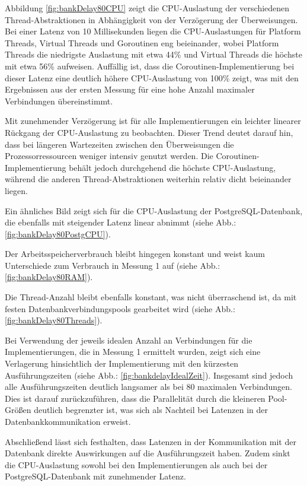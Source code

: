 \documentclass[fontsize=12pt,paper=a4,twoside=semi,parskip=half-,headsepline,headinclude]{scrreprt}
\begin{document}
Abbildung \ref{fig:bankDelay80CPU} zeigt die CPU-Auslastung der verschiedenen Thread-Abstraktionen in Ab\-hän\-gig\-keit von der Verzögerung der Überweisungen. Bei einer Latenz von 10 Millisekunden liegen die CPU-Auslastungen für Platform Threads, Virtual Threads und Goroutinen eng beieinander, wobei Platform Threads die niedrigste Auslastung mit etwa 44\% und Virtual Threads die höchste mit etwa 56\% aufweisen. Auffällig ist, dass die Coroutinen-Implementierung bei dieser Latenz eine deutlich höhere CPU-Auslastung von 100\% zeigt, was mit den Ergebnissen aus der ersten Messung für eine hohe Anzahl maximaler Verbindungen übereinstimmt.

Mit zunehmender Verzögerung ist für alle Implementierungen ein leichter linearer Rück\-gang der CPU-Auslastung zu beobachten. Dieser Trend deutet darauf hin, dass bei längeren Wartezeiten zwischen den Überweisungen die Prozessorressourcen weniger intensiv genutzt werden. Die Coroutinen-Implementierung behält jedoch durchgehend die höchste CPU-Auslastung, während die anderen Thread-Abstraktionen weiterhin relativ dicht beieinander liegen.

Ein ähnliches Bild zeigt sich für die CPU-Auslastung der PostgreSQL-Datenbank, die ebenfalls mit steigender Latenz linear abnimmt (siehe Abb.: \ref{fig:bankDelay80PostgCPU}). 

Der Arbeitsspeicherverbrauch bleibt hingegen konstant und weist kaum Unterschiede zum Verbrauch in Messung 1 auf (siehe Abb.: \ref{fig:bankDelay80RAM}).

Die Thread-Anzahl bleibt ebenfalls konstant, was nicht überraschend ist, da mit festen Datenbankverbindungspools gearbeitet wird (siehe Abb.: \ref{fig:bankDelay80Threads}).

Bei Verwendung der jeweils idealen Anzahl an Verbindungen für die Implementierungen, die in Messung 1 ermittelt wurden, zeigt sich eine Verlagerung hinsichtlich der Implementierung mit den kürzesten Ausführungszeiten (siehe Abb.: \ref{fig:bankdelayIdealZeit}). Insgesamt sind jedoch alle Ausführungszeiten deutlich langsamer als bei 80 maximalen Verbindungen. Dies ist darauf zurückzuführen, dass die Parallelität durch die kleineren Pool-Größen deutlich begrenzter ist, was sich als Nachteil bei Latenzen in der Datenbankkommunikation erweist.

Abschließend lässt sich festhalten, dass Latenzen in der Kommunikation mit der Datenbank direkte Auswirkungen auf die Ausführungszeit haben. Zudem sinkt die CPU-Auslastung sowohl bei den Implementierungen als auch bei der PostgreSQL-Datenbank mit zunehmender Latenz.
\end{document}

